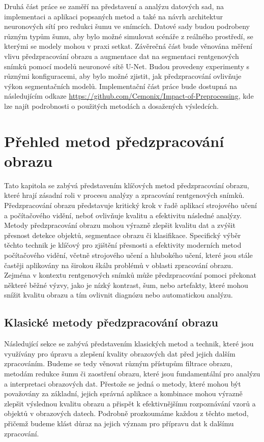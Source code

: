 \documentclass[male,czech,api_ing]{thesis}
\begin{document}
Druhá část práce se zaměří na představení a analýzu datových sad, na implementaci a aplikaci popsaných metod a také na návrh architektur neuronových sítí pro redukci šumu ve snímcích. Datové sady budou podrobeny různým typům šumu, aby bylo možné simulovat scénáře z reálného prostředí, se kterými se modely mohou v praxi setkat. Závěrečná část bude věnována měření vlivu předzpracování obrazu a augmentace dat na segmentaci rentgenových snímků pomocí modelů neuronové sítě U-Net. Budou provedeny experimenty s různými konfiguracemi, aby bylo možné zjistit, jak předzpracování ovlivňuje výkon segmentačních modelů. Implementační část práce bude dostupná na následujícím odkaze \url{https://github.com/Cemonix/Impact-of-Preprocessing}, kde lze najít podrobnosti o použitých metodách a dosažených výsledcích.

\chapter{Přehled metod předzpracování obrazu}
Tato kapitola se zabývá představením klíčových metod předzpracování obrazu, které hrají zásadní roli v procesu analýzy a zpracování rentgenových snímků. Předzpracování obrazu představuje kritický krok v řadě aplikací strojového učení a počítačového vidění, neboť ovlivňuje kvalitu a efektivitu následné analýzy. Metody předzpracování obrazu mohou výrazně zlepšit kvalitu dat a zvýšit přesnost detekce objektů, segmentace obrazu či klasifikace. Specifický výběr těchto technik je klíčový pro zjištění přesnosti a efektivity moderních metod počítačového vidění, včetně strojového učení a hlubokého učení, které jsou stále častěji aplikovány na širokou škálu problémů v oblasti zpracování obrazu. Zejména v kontextu rentgenových snímků může předzpracování pomoci překonat některé běžné výzvy, jako je nízký kontrast, šum, nebo artefakty, které mohou snížit kvalitu obrazu a tím ovlivnit diagnózu nebo automatickou analýzu.\cite{ImportanceOfImageProcessing}

\section{Klasické metody předzpracování obrazu}
Následující sekce se zabývá představením klasických metod a technik, které jsou využívány pro úpravu a zlepšení kvality obrazových dat před jejich dalším zpracováním. Budeme se tedy věnovat různým přístupům filtrace obrazu, metodám redukce šumu či zaostření obrazu, které jsou fundamentální pro analýzu a interpretaci obrazových dat. Přestože se jedná o metody, které mohou být považovány za základní, jejich správná aplikace a kombinace mohou výrazně zlepšit výslednou kvalitu obrazu a přispět k efektivnějšímu rozpoznávání vzorů a objektů v obrazových datech. Podrobně prozkoumáme každou z těchto metod, přičemž budeme klást důraz na jejich význam pro přípravu dat k dalšímu zpracování.
\end{document}
